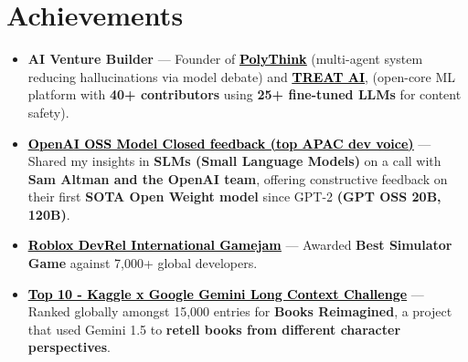 \documentclass[letterpaper,10.8pt]{article}
\let\oldhref\href
\renewcommand{\href}[2]{\oldhref{#1}{\textcolor{linkgrey}{\uline{\textcolor{black}{#2}}}}}
\newcommand{\resumeSubHeadingListStart}{\begin{itemize}[leftmargin=*]}
\newcommand{\resumeSubHeadingListEnd}{\end{itemize}}
\begin{document}
\section*{Achievements}
\resumeSubHeadingListStart

\item\textbf{AI Venture Builder} — Founder of \textbf{\href{https://www.polyth.ink/}{PolyThink}} (multi-agent system reducing hallucinations via model debate) and \textbf{\href{https://trytreat.tech/}{TREAT AI}}, (open-core ML platform with \textbf{40+ contributors} using \textbf{25+ fine-tuned LLMs} for content safety).

\item\textbf{\href{https://www.linkedin.com/feed/update/urn:li:activity:7322867944181399552/}{OpenAI OSS Model Closed feedback (top APAC dev voice)}} — Shared my insights in \textbf{SLMs (Small Language Models)} on a call with \textbf{Sam Altman and the OpenAI team}, offering constructive feedback on their first \textbf{SOTA Open Weight model} since GPT-2 \textbf{(GPT OSS 20B, 120B)}.

  \item \textbf{\href{https://media.licdn.com/dms/image/v2/D562DAQG7PINx-24MPA/profile-treasury-image-shrink_800_800/profile-treasury-image-shrink_800_800/0/1723232806730?e=1741608000\&v=beta\&t=UIry8g7Tyj4Lo9cnannvYgDn-ZYgYkDLdvKInLc7XVU}{Roblox DevRel International Gamejam}} — Awarded \textbf{Best Simulator Game} against 7,000+ global developers.

  \item \textbf{\href{https://www.kaggle.com/code/kubermehta/books-reimagined-diary-of-a-wimpy-kid-by-rodrick}{Top 10 - Kaggle x Google Gemini Long Context Challenge}} — Ranked globally amongst 15,000 entries for \textbf{Books Reimagined}, a project that used Gemini 1.5 to \textbf{retell books from different character perspectives}.

\resumeSubHeadingListEnd
\end{document}
